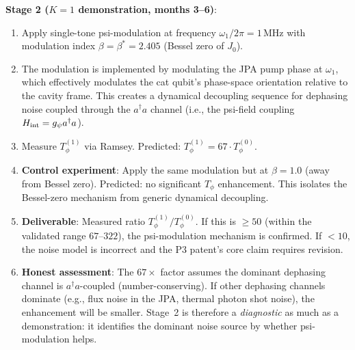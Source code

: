 \documentclass[11pt]{article}
\theoremstyle{definition}
\theoremstyle{remark}
\begin{document}
\begin{tcolorbox}[colback=blue!5!white, colframe=blue!60!black,
  title=\textbf{W4i16 TOP 5 FINDINGS --- READ FIRST}]
\begin{enumerate}[nosep]
  \textbf{Stage 2 ($K=1$ demonstration, months 3--6)}:
  \begin{enumerate}[nosep]
    \item Apply single-tone psi-modulation at frequency
      $\omega_1/2\pi = 1$\,MHz with modulation index
      $\beta = \beta^* = 2.405$ (Bessel zero of $J_0$).
    \item The modulation is implemented by modulating the JPA pump
      phase at $\omega_1$, which effectively modulates the cat qubit's
      phase-space orientation relative to the cavity frame.  This
      creates a dynamical decoupling sequence for dephasing noise
      coupled through the $a^\dagger a$ channel (i.e., the psi-field
      coupling $H_{\rm int} = g_\psi a^\dagger a$).
    \item Measure $T_\phi^{(1)}$ via Ramsey.  Predicted:
      $T_\phi^{(1)} = 67 \cdot T_\phi^{(0)}$.
    \item \textbf{Control experiment}: Apply the same modulation but
      at $\beta = 1.0$ (away from Bessel zero).  Predicted: no
      significant $T_\phi$ enhancement.  This isolates the
      Bessel-zero mechanism from generic dynamical decoupling.
    \item \textbf{Deliverable}: Measured ratio
      $T_\phi^{(1)}/T_\phi^{(0)}$.  If this is $\geq 50$ (within
      the validated range $67$--$322$), the psi-modulation mechanism
      is confirmed.  If $< 10$, the noise model is incorrect and
      the P3 patent's core claim requires revision.
    \item \textbf{Honest assessment}: The $67\times$ factor assumes
      the dominant dephasing channel is $a^\dagger a$-coupled
      (number-conserving).  If other dephasing channels dominate
      (e.g., flux noise in the JPA, thermal photon shot noise),
      the enhancement will be smaller.  Stage~2 is therefore a
      \emph{diagnostic} as much as a demonstration: it identifies the
      dominant noise source by whether psi-modulation helps.
  \end{enumerate}


\end{enumerate}
\end{tcolorbox}
\end{document}
